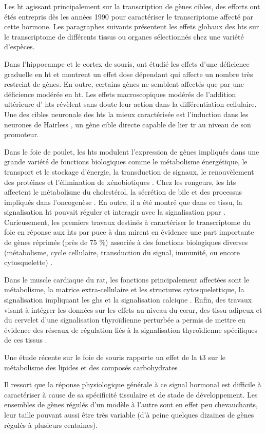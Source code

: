 \documentclass[../main.tex]{subfiles}
\begin{document}
		Les \gls{ht} agissant principalement sur la transcription de gènes cibles, des efforts ont étés entrepris dès les années 1990 pour caractériser le transcriptome affecté par cette hormone.
		Les paragraphes suivants présentent les effets globaux des \glspl{ht} sur le transcriptome de différents tissus ou organes sélectionnés chez une variété d'espèces.
		\par
		Dans l'hippocampe et le cortex de souris, \citet{Chatonnet2011} ont étudié les effets d'une déficience graduelle en \gls{ht} et montrent un effet dose dépendant qui affecte un nombre très restreint de gènes.
		En outre, certains gènes ne semblent affectés que par une déficience modérée en \gls{ht}.
		Les effets macroscopiques modérés de l'addition ultérieure d' \glspl{ht} révèlent sans doute leur action dans la différentiation cellulaire.
		Une des cibles neuronale des \glspl{ht} la mieux caractérisée est l'induction dans les neurones de Hairless \citep{Thompson1996}, un gène cible directe capable de lier \gls{tr} au niveau de son promoteur.
		\par
		Dans le foie de poulet, les \glspl{ht} modulent l'expression de gènes impliqués dans une grande variété de fonctions biologiques comme le métabolisme énergétique, le transport et le stockage d'énergie, la transduction de signaux, le renouvèlement des protéines et l'élimination de xénobiotiques \citep{Wang2007}.
		Chez les rongeurs, les \glspl{ht} affectent le métabolisme du cholestérol, la sécrétion de bile et des processus impliqués dans l'oncogenèse \citep{Ventura-Holman2007}.
		En outre, il a été montré que dans ce tissu, la signalisation \gls{ht} pouvait réguler et interagir avec la signalisation \gls{ppar} \citep{Weitzel2003}.
		Curieusement, les premiers travaux destinés à caractériser le transcriptome du foie en réponse aux  \glspl{ht} par puce à \gls{dna} mirent en évidence une part importante de gènes réprimés (près de 75 \%) associés à des fonctions biologiques diverses (métabolisme, cycle cellulaire, transduction du signal, immunité, ou encore cytosquelette) \citep{Feng2000}.
		\par
		Dans le muscle cardiaque du rat, les fonctions principalement affectées sont le métabolisme, la matrice extra-cellulaire et les structures cytosquelettique, la signalisation impliquant les \glspl{gh} et la signalisation calcique \citep{De2004}.
		Enfin, des travaux visant à intégrer les données sur les effets au niveau du cœur, des tissu adipeux et du cervelet d'une signalisation thyroïdienne perturbée a permis de mettre en évidence des réseaux de régulation liés à la signalisation thyroïdienne spécifiques de ces tissus \citep{Miller2004}.
		\par
		Une étude récente sur le foie de souris rapporte un effet de la \gls{t3} sur le métabolisme des lipides et des composés carbohydrates \citep{Ramadoss2014}.
		\par
		Il ressort que la réponse physiologique générale à ce signal hormonal est difficile à caractériser à cause de sa spécificité tissulaire et de stade de développement.
		Les ensembles de gènes régulés d'un modèle à l'autre sont en effet peu chevauchants, leur taille pouvant aussi être très variable (d'à peine quelques dizaines de gènes régulés à plusieurs centaines).

\end{document}
